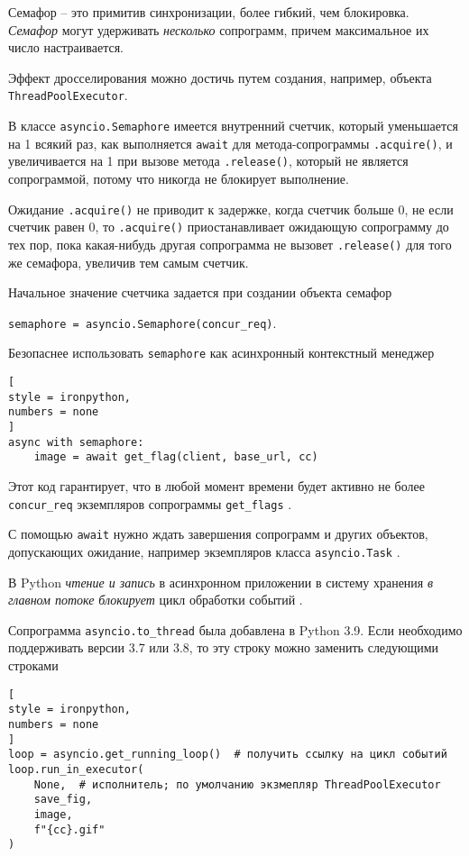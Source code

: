 \documentclass[%
	11pt,
	a4paper,
	utf8,
		]{article}
\begin{document}
Семафор -- это примитив синхронизации, более гибкий, чем блокировка. \emph{Семафор} могут удерживать \emph{несколько} сопрограмм, причем максимальное их число настраивается. 

Эффект дросселирования можно достичь путем создания, например, объекта \verb|ThreadPoolExecutor|.

В классе \verb*|asyncio.Semaphore| имеется внутренний счетчик, который уменьшается на 1 всякий раз, как выполняется \verb|await| для метода-сопрограммы \verb*|.acquire()|, и увеличивается на 1 при вызове метода \verb|.release()|, который не является сопрограммой, потому что никогда не блокирует выполнение.

Ожидание \verb*|.acquire()| не приводит к задержке, когда счетчик больше 0, не если счетчик равен 0, то  \verb|.acquire()| приостанавливает ожидающую сопрограмму до тех пор, пока какая-нибудь другая сопрограмма не вызовет \verb*|.release()| для того же семафора, увеличив тем самым счетчик.

Начальное значение счетчика задается при создании объекта семафор

\noindent\verb|semaphore = asyncio.Semaphore(concur_req)|.

Безопаснее использовать \verb|semaphore| как асинхронный контекстный менеджер
\begin{lstlisting}[
style = ironpython,
numbers = none
]
async with semaphore:
    image = await get_flag(client, base_url, cc)
\end{lstlisting}

Этот код гарантирует, что в любой момент времени будет активно не более \verb|concur_req| экземпляров сопрограммы \verb*|get_flags| \cite[]{ramalho:python-2022}.

С помощью \verb|await| нужно ждать завершения сопрограмм и других объектов, допускающих ожидание, например экземпляров класса \verb*|asyncio.Task| \cite[]{ramalho:python-2022}.

В Python \emph{чтение и запись} в асинхронном приложении в систему хранения \emph{в главном потоке} \emph{\color{red}блокирует} цикл обработки событий \cite[]{ramalho:python-2022}.

Сопрограмма \verb|asyncio.to_thread| была добавлена в Python 3.9. Если необходимо поддерживать версии 3.7 или 3.8, то эту строку можно заменить следующими строками \cite[]{ramalho:python-2022}
\begin{lstlisting}[
style = ironpython,
numbers = none
]
loop = asyncio.get_running_loop()  # получить ссылку на цикл событий
loop.run_in_executor(
    None,  # исполнитель; по умолчанию экзмепляр ThreadPoolExecutor
    save_fig,
    image,
    f"{cc}.gif"
)
\end{lstlisting}
\end{document}
